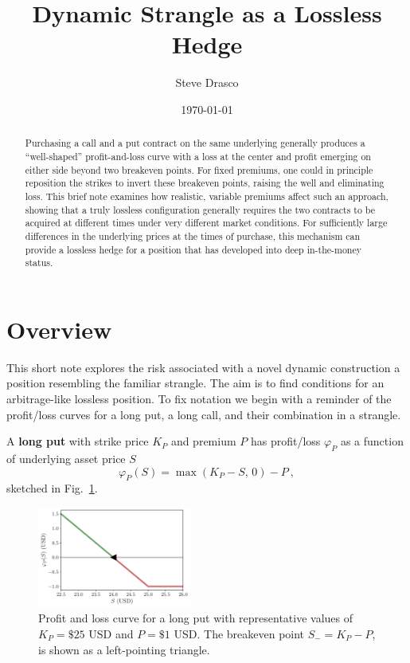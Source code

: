 \documentclass[aps,reprint]{revtex4-2}
\begin{document}
\title{Dynamic Strangle as a Lossless Hedge}
\author{Steve Drasco}
\date{\today}

\begin{abstract}
Purchasing a call and a put contract on the same underlying generally produces a “well-shaped” profit-and-loss curve with a loss at the center and profit emerging on either side beyond two breakeven points. For fixed premiums, one could in principle reposition the strikes to invert these breakeven points, raising the well and eliminating loss. This brief note examines how realistic, variable premiums affect such an approach, showing that a truly lossless configuration generally requires the two contracts to be acquired at different times under very different market conditions. For sufficiently large differences in the underlying prices at the times of purchase, this mechanism can provide a lossless hedge for a position that has developed into deep in-the-money status.
\end{abstract}

\maketitle

\section{Overview}

This short note explores the risk associated with a novel dynamic construction a position resembling the familiar strangle.  The aim is to find conditions for an arbitrage-like lossless position.  To fix notation we begin with a reminder of the profit/loss curves for a long put, a long call, and their combination in a strangle. 

A \textbf{long put} with strike price $K_P$ and premium $P$ has profit/loss $\varphi_P$ as a function of underlying asset price $S$
\begin{equation}
\varphi_P(S) = \max(K_P - S,\,0) - P~,
\end{equation}
sketched in Fig.~\ref{fig:put}.
\begin{figure}[hb]
    \centering
    \includegraphics[width=0.45\textwidth]{figs/put.pdf}
    \caption{Profit and loss curve for a long put with representative values of $K_P = \$25$ USD and $P = \$1$ USD.  The breakeven point $S_- = K_P - P$, is shown as a left-pointing triangle.}
    \label{fig:put}
\end{figure}
\end{document}
